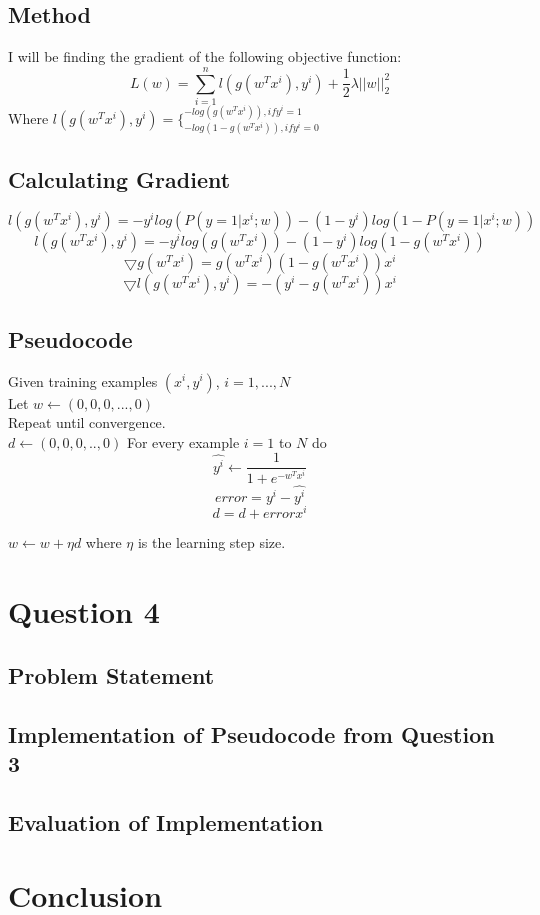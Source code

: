 \documentclass[letterpaper,10pt]{article}
\begin{document}
\subsection{Method}
I will be finding the gradient of the following objective function:
\[L(w) = \sum_{i=1}^n l(g(w^T x^i), y^i) + \frac{1}{2} \lambda ||w||_2^2  \]
Where \(l(g(w^T x^i), y^i) = \{^{-log(g(w^T x^i)), if y^i = 1}_{-log(1-g(w^T x^i)), if y^i = 0} \)

\subsection{Calculating Gradient}
\[ l(g(w^T x^i), y^i) = -y^i log(P(y=1 | x^i; w)) - (1-y^i) log(1-P(y=1 | x^i; w)) \]
\[ l(g(w^T x^i), y^i) = -y^i log(g(w^T x^i)) - (1-y^i) log(1 - g(w^T x^i)) \]
\[ \bigtriangledown g(w^T x^i) = g(w^T x^i) (1 - g(w^T x^i)) x^i \]
\[ \bigtriangledown l(g(w^T x^i), y^i) = -(y^i - g(w^T x^i)) x^i \]

\subsection{Pseudocode}
Given training examples \((x^i, y^i)\), \(i=1,...,N\)\\
Let \(w \leftarrow (0,0,0,...,0)\)\\
Repeat until convergence.\\
\(d \leftarrow (0,0,0,..,0)\)
For every example \(i=1\) to \(N\) do\\
\[ \hat{y^i} \leftarrow \frac{1}{1+e^{-w^T x^i}} \]
\[ error = y^i - \hat{y^i} \]
\[ d = d + error x^i \]

\(w \leftarrow w + \eta d \) where \(\eta\) is the learning step size.

\section{Question 4}
\subsection{Problem Statement}

\subsection{Implementation of Pseudocode from Question 3}
\subsection{Evaluation of Implementation}

\section{Conclusion}
\end{document}
